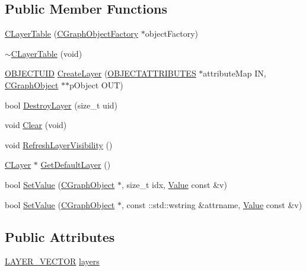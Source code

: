 \subsection*{Public Member Functions}
\begin{DoxyCompactItemize}
\item 
\hyperlink{class_c_layer_table_a09fc2fd20604d02458fb271eea55c558}{C\+Layer\+Table} (\hyperlink{class_c_graph_object_factory}{C\+Graph\+Object\+Factory} $\ast$object\+Factory)
\item 
\hyperlink{class_c_layer_table_a933616ffb5fe569ae9e39fca575046e7}{$\sim$\+C\+Layer\+Table} (void)
\item 
\hyperlink{_object_database_defines_8h_a164ec120b01429b93c9cd0bef2a67e64}{O\+B\+J\+E\+C\+T\+U\+I\+D} \hyperlink{class_c_layer_table_a71262ee99844c6d8fd45d5fc2b99e157}{Create\+Layer} (\hyperlink{_object_database_defines_8h_a52d1b76b66b20eeaf0c5dc8127da21d7}{O\+B\+J\+E\+C\+T\+A\+T\+T\+R\+I\+B\+U\+T\+E\+S} $\ast$attribute\+Map I\+N, \hyperlink{class_c_graph_object}{C\+Graph\+Object} $\ast$$\ast$p\+Object O\+U\+T)
\item 
bool \hyperlink{class_c_layer_table_a53bb6bc2b2aa5d5064c21afdf58f5aab}{Destroy\+Layer} (size\+\_\+t uid)
\item 
void \hyperlink{class_c_layer_table_aab8f59a0888c40afec0813b5b61e105e}{Clear} (void)
\item 
void \hyperlink{class_c_layer_table_ac673d82ff254530528f29931f73c6f5c}{Refresh\+Layer\+Visibility} ()
\item 
\hyperlink{class_c_layer}{C\+Layer} $\ast$ \hyperlink{class_c_layer_table_a0c2ba3b02174839df30b7f0bf47b13d9}{Get\+Default\+Layer} ()
\item 
bool \hyperlink{class_c_layer_table_a029505beda2f32bddd84354235e90e50}{Set\+Value} (\hyperlink{class_c_graph_object}{C\+Graph\+Object} $\ast$, size\+\_\+t idx, \hyperlink{class_value}{Value} const \&v)
\item 
bool \hyperlink{class_c_layer_table_a4f309df5a3c4cbce50aa085ce2d29944}{Set\+Value} (\hyperlink{class_c_graph_object}{C\+Graph\+Object} $\ast$, const \+::std\+::wstring \&attrname, \hyperlink{class_value}{Value} const \&v)
\end{DoxyCompactItemize}
\subsection*{Public Attributes}
\begin{DoxyCompactItemize}
\item 
\hyperlink{class_c_layer_table_acd81eed52c55ccd6ba9fcbe3bd2451dc}{L\+A\+Y\+E\+R\+\_\+\+V\+E\+C\+T\+O\+R} \hyperlink{class_c_layer_table_aa8c5aada3ac311d579ba49b71a6f90f0}{layers}
\end{DoxyCompactItemize}
